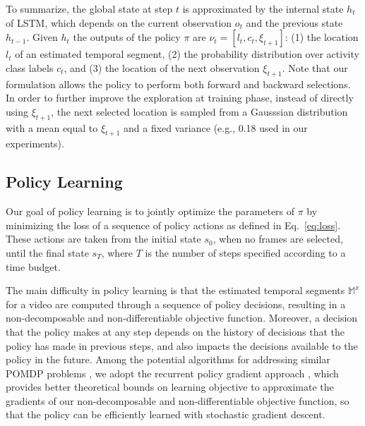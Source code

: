 \documentclass{bmvc2k}
\begin{document}
To summarize, the global state at step $t$  is approximated by the internal state $h_t$ of LSTM, which depends on the current observation $o_t$ and the previous state $h_{t-1}$. Given $h_t$ the outputs of the policy $\pi$ are $\nu_t = \left[ l_t, c_t, \xi_{t+1} \right]$: (1) the location $l_t$ of an estimated temporal segment, (2) the probability distribution over activity class labels $c_t$, and (3) the location of the next observation $\xi_{t+1}$. Note that our formulation allows the policy to perform both forward and backward selections. In order to further improve the exploration at training phase, instead of directly using $\xi_{t+1}$, the next selected location is sampled from a Gausssian distribution with a mean equal to $\xi_{t+1}$ and a fixed variance (e.g., 0.18 used in our experiments). 

\subsection{Policy Learning}
\label{sec:policy-learning}

Our goal of policy learning is to jointly optimize the parameters of $\pi$ by minimizing the loss of a sequence of policy actions as defined in Eq.~\eqref{eq:loss}. These actions are taken from the initial state $s_0$, when no frames are selected, until the final state $s_T$, where $T$ is the number of steps specified according to a time budget. 

The main difficulty in policy learning is that the estimated temporal segments $\mathbb{M}^x$ for a video are computed through a sequence of policy decisions, resulting in a non-decomposable and non-differentiable objective function. Moreover, a decision that the policy makes at any step depends on the history of decisions that the policy has made in previous steps, and also impacts the decisions available to the policy in the future. %
Among the potential algorithms for addressing similar POMDP problems \cite{cho2017robust,egorov2017pomdps,wierstra2010recurrent,williams1992simple}, we adopt the recurrent policy gradient approach \cite{wierstra2010recurrent}, which provides better theoretical bounds on learning objective to approximate the gradients of our non-decomposable and non-differentiable objective function, so that the policy can be efficiently learned with stochastic gradient descent.
\end{document}
